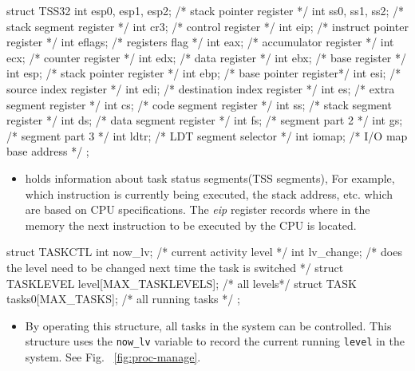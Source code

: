 \documentclass{swfcthesis}
\begin{document}
\begin{codeblock}[1]
\begin{ccode}
struct TSS32
{ 
  int esp0, esp1, esp2; /* stack pointer register */
  int ss0, ss1, ss2;    /* stack segment register */
  int cr3;    /* control register */
  int eip;    /* instruct pointer register */
  int eflags; /* registers flag */
  int eax;    /* accumulator register */
  int ecx;    /* counter register */
  int edx;    /* data register */
  int ebx;    /* base register */
  int esp;    /* stack pointer register */
  int ebp;    /* base pointer register*/
  int esi;    /* source index register */
  int edi;    /* destination index register */
  int es;     /* extra segment register */
  int cs;     /* code segment register */
  int ss;     /* stack segment register */
  int ds;     /* data segment register */
  int fs;     /* segment part 2 */
  int gs;     /* segment part 3 */
  int ldtr;   /* LDT segment selector */
  int iomap;  /* I/O map base address */
};
\end{ccode}
\end{codeblock}
\begin{itemize}
\item holds information about task status segments(TSS segments), For example, which
  instruction is currently being executed, the stack address, etc. which are based on CPU
  specifications\cite[Sec.6.2.1]{intel_3a}. The \emph{eip} register records where in the
  memory the next instruction to be executed by the CPU is located.
\end{itemize}

\begin{codeblock}[1]
\begin{ccode}
struct TASKCTL
{ 
  int now_lv;    /* current activity level */
  int lv_change; /* does the level need to be changed next time the task is switched */
  struct TASKLEVEL level[MAX_TASKLEVELS]; /* all levels*/
  struct TASK tasks0[MAX_TASKS];          /* all running tasks */
};
\end{ccode}
\end{codeblock}
\begin{itemize}
\item By operating this structure, all tasks in the system can be controlled. This
  structure uses the \texttt{now\_lv} variable to record the current running
  \texttt{level} in the system. See Fig. ~\ref{fig:proc-manage}.
  
  
\end{itemize}
\end{document}
